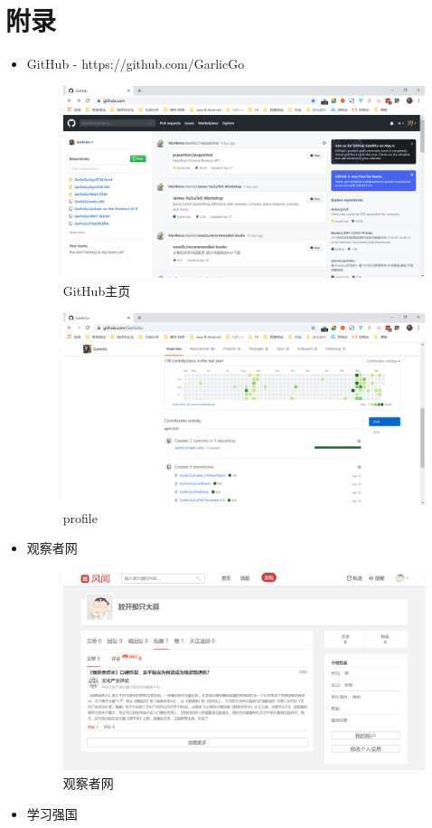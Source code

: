\documentclass{article}
\begin{document}
\section{附录}
\begin{itemize}
    \item GitHub  - https://github.com/GarlicGo
    \begin{figure}[H]
    	\centering
    	\includegraphics[width=0.7\linewidth]{github1}
    	\caption{GitHub主页}
    	\label{fig:github1}
    \end{figure}
    \begin{figure}[H]
    	\centering
    	\includegraphics[width=0.7\linewidth]{github2}
    	\caption{profile}
    	\label{fig:github2}
    \end{figure}
	\item 观察者网
	\begin{figure}[H]
		\centering
		\includegraphics[width=0.7\linewidth]{gczw}
		\caption{观察者网}
		\label{fig:gczw}
	\end{figure}
	\item 学习强国

\end{itemize}
\end{document}
